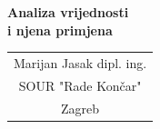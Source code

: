 \documentclass[a4paper,12pt]{article}
\numberwithin{figure}{section}
\begin{document}
\begin{titlepage}
\begin{titlepage}
  \null\vfill

  \begin{center}

  {\huge\bfseries Analiza vrijednosti \\ i njena primjena}
  \vskip 2cm
  
  \end{center}

\vfill


\begin{tabular}[t]{c}
Marijan Jasak dipl. ing.\\ SOUR "Rade Končar" \\ Zagreb
\end{tabular}
\hfill
\end{titlepage}
\end{titlepage}
\end{document}
